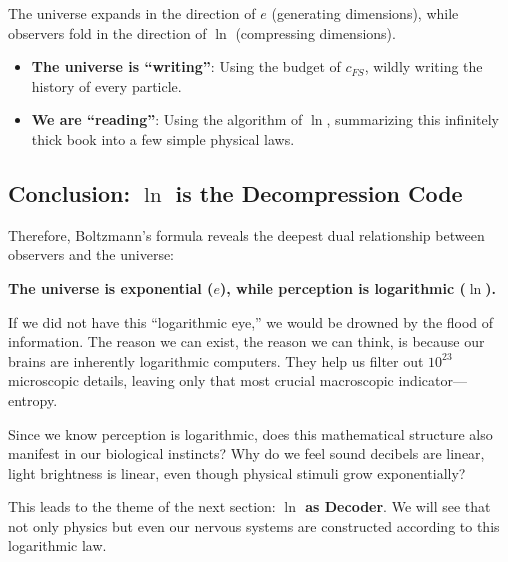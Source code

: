 The universe expands in the direction of $e$ (generating dimensions), while observers fold in the direction of $\ln$ (compressing dimensions).

\begin{itemize}
\item \textbf{The universe is ``writing''}: Using the budget of $c_{FS}$, wildly writing the history of every particle.

\item \textbf{We are ``reading''}: Using the algorithm of $\ln$, summarizing this infinitely thick book into a few simple physical laws.
\end{itemize}

\subsection{Conclusion: $\ln$ is the Decompression Code}

Therefore, Boltzmann's formula reveals the deepest dual relationship between observers and the universe:

\textbf{The universe is exponential ($e$), while perception is logarithmic ($\ln$).}

If we did not have this ``logarithmic eye,'' we would be drowned by the flood of information. The reason we can exist, the reason we can think, is because our brains are inherently logarithmic computers. They help us filter out $10^{23}$ microscopic details, leaving only that most crucial macroscopic indicator---entropy.

Since we know perception is logarithmic, does this mathematical structure also manifest in our biological instincts? Why do we feel sound decibels are linear, light brightness is linear, even though physical stimuli grow exponentially?

This leads to the theme of the next section: \textbf{$\ln$ as Decoder}. We will see that not only physics but even our nervous systems are constructed according to this logarithmic law.

